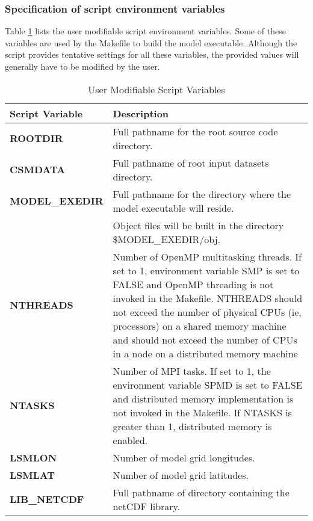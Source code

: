 \subsubsection {Specification of script environment variables}
\label{subsubsec_env_vars}
 
Table \ref{table_env_vars} lists the user modifiable script
environment variables. Some of these variables are used by the
Makefile to build the model executable.  Although the script provides
tentative settings for all these variables, the provided values will
generally have to be modified by the user.

\bigskip
\begin{longtable}{|p{1.5in}|p{4.5in}|}
\caption{\label{table_env_vars} User Modifiable Script Variables} \\
\hline
\endhead
\hline
{\bf Script Variable} & {\bf Description}  \\ \hline \hline
{\bf ROOTDIR}        &   Full pathname for the root source code directory. \\ \hline
{\bf CSMDATA}        &   Full pathname of root input datasets directory. \\ \hline
{\bf MODEL\_EXEDIR}  &   Full pathname for the directory where the model executable will reside. \\
                     &   Object files will be built in the directory \$MODEL\_EXEDIR/obj. \\ \hline
{\bf NTHREADS}       &   Number of OpenMP multitasking threads.
	                 If set to 1, environment variable SMP is set to FALSE and 
                         OpenMP threading is not invoked in the Makefile.
                         NTHREADS should not exceed the number of physical CPUs (ie, processors) 
	                 on a shared memory machine and should not exceed the number of CPUs 
                         in a node on a distributed memory machine \\ \hline
{\bf NTASKS}         &   Number of MPI tasks. 
		         If set to 1, the environment variable SPMD is set to FALSE and 
                         distributed memory implementation is not invoked in the Makefile.
                         If NTASKS is greater than 1, distributed memory is enabled. \\ \hline
{\bf LSMLON}         &   Number of model grid longitudes. \\ \hline
{\bf LSMLAT}         &   Number of model grid latitudes. \\ \hline
{\bf LIB\_NETCDF}    &   Full pathname of directory containing the netCDF library. \\

\end{longtable}
